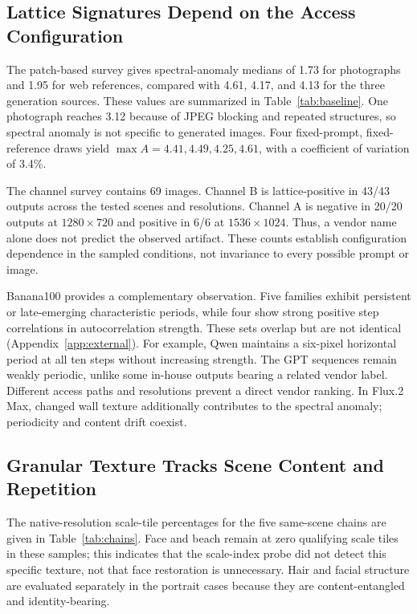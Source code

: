 \documentclass[sigplan,10pt,nonacm]{acmart}
\begin{document}
\subsection{Lattice Signatures Depend on the Access Configuration}
The patch-based survey gives spectral-anomaly medians of 1.73 for photographs and 1.95 for web references, compared with 4.61, 4.17, and 4.13 for the three generation sources. These values are summarized in Table~\ref{tab:baseline}. One photograph reaches 3.12 because of JPEG blocking and repeated structures, so spectral anomaly is not specific to generated images. Four fixed-prompt, fixed-reference draws yield $\max A=4.41,4.49,4.25,4.61$, with a coefficient of variation of 3.4\%.

The channel survey contains 69 images. Channel B is lattice-positive in 43/43 outputs across the tested scenes and resolutions. Channel A is negative in 20/20 outputs at $1280\times720$ and positive in 6/6 at $1536\times1024$. Thus, a vendor name alone does not predict the observed artifact. These counts establish configuration dependence in the sampled conditions, not invariance to every possible prompt or image.

Banana100 provides a complementary observation. Five families exhibit persistent or late-emerging characteristic periods, while four show strong positive step correlations in autocorrelation strength. These sets overlap but are not identical (Appendix~\ref{app:external}). For example, Qwen maintains a six-pixel horizontal period at all ten steps without increasing strength. The GPT sequences remain weakly periodic, unlike some in-house outputs bearing a related vendor label. Different access paths and resolutions prevent a direct vendor ranking. In Flux.2 Max, changed wall texture additionally contributes to the spectral anomaly; periodicity and content drift coexist.

\subsection{Granular Texture Tracks Scene Content and Repetition}
The native-resolution scale-tile percentages for the five same-scene chains are given in Table~\ref{tab:chains}. Face and beach remain at zero qualifying scale tiles in these samples; this indicates that the scale-index probe did not detect this specific texture, not that face restoration is unnecessary. Hair and facial structure are evaluated separately in the portrait cases because they are content-entangled and identity-bearing.
\end{document}
